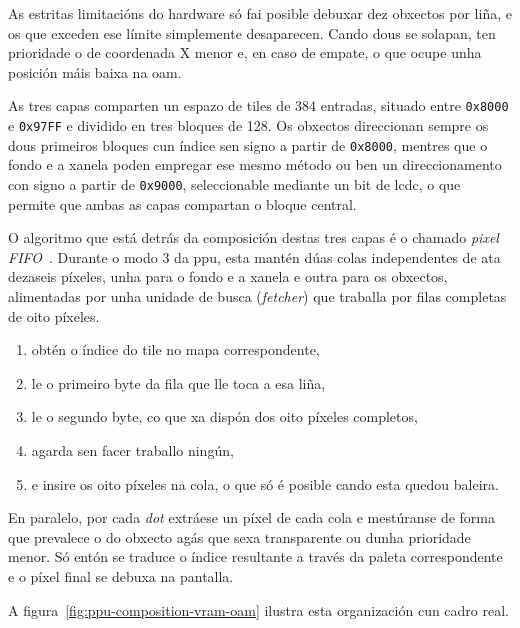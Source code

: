 As estritas limitacións do hardware só fai posible debuxar dez
obxectos por liña, e os que exceden ese límite simplemente desaparecen.
Cando dous se solapan, ten prioridade o de coordenada X menor e, en caso de empate,
o que ocupe unha posición máis baixa na \acrshort{oam}.

As tres capas comparten un espazo de \glspl{tile} de 384 entradas, situado entre
\texttt{0x8000} e \texttt{0x97FF} e dividido en tres bloques de 128.
Os obxectos direccionan sempre
os dous primeiros bloques cun índice sen signo a partir de \texttt{0x8000}, mentres que o
fondo e a xanela poden empregar ese mesmo método ou ben un direccionamento con signo a
partir de \texttt{0x9000}, seleccionable mediante un bit de \acrshort{lcdc}, o que permite
que ambas as capas compartan o bloque central.

O algoritmo que está detrás da composición destas tres capas é o chamado \textit{pixel FIFO}~\cite{pandocs}.
Durante o modo 3 da \acrshort{ppu}, esta mantén dúas colas independentes de ata dezaseis píxeles,
unha para o fondo e a xanela e outra para os obxectos,
alimentadas por unha unidade de busca (\textit{fetcher}) que traballa por filas completas de oito píxeles.

\begin{enumerate}
  \item obtén o índice do \gls{tile} no mapa correspondente,
  \item le o primeiro byte da fila que lle toca a esa liña,
  \item le o segundo byte, co que xa dispón dos oito píxeles completos,
  \item agarda sen facer traballo ningún,
  \item e insire os oito píxeles na cola, o que só é posible cando esta quedou baleira.
\end{enumerate}

En paralelo, por cada \textit{dot} extráese un píxel de cada cola e mestúranse 
de forma que prevalece o do obxecto agás que sexa transparente ou dunha prioridade menor.
Só entón se traduce o índice resultante a través da paleta correspondente
e o píxel final se debuxa na pantalla.


A figura~\ref{fig:ppu-composition-vram-oam} ilustra esta organización cun cadro real.

